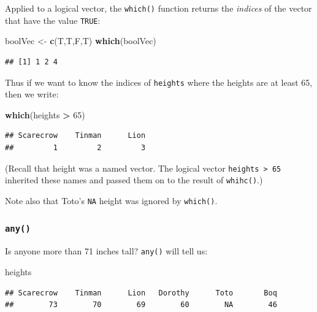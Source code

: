 \documentclass[]{book}
\makeatletter
\newenvironment{Shaded}{\begin{snugshade}}{\end{snugshade}}
\newcommand{\KeywordTok}[1]{\textcolor[rgb]{0.13,0.29,0.53}{\textbf{#1}}}
\newcommand{\DecValTok}[1]{\textcolor[rgb]{0.00,0.00,0.81}{#1}}
\newcommand{\StringTok}[1]{\textcolor[rgb]{0.31,0.60,0.02}{#1}}
\newcommand{\OperatorTok}[1]{\textcolor[rgb]{0.81,0.36,0.00}{\textbf{#1}}}
\newcommand{\NormalTok}[1]{#1}
\newenvironment{kframe}{%
\medskip{}
\setlength{\fboxsep}{.8em}
 \def\at@end@of@kframe{}%
 \ifinner\ifhmode%
  \def\at@end@of@kframe{\end{minipage}}%
  \begin{minipage}{\columnwidth}%
 \fi\fi%
 \def\FrameCommand##1{\hskip\@totalleftmargin \hskip-\fboxsep
 \colorbox{shadecolor}{##1}\hskip-\fboxsep
     \hskip-\linewidth \hskip-\@totalleftmargin \hskip\columnwidth}%
 \MakeFramed {\advance\hsize-\width
   \@totalleftmargin\z@ \linewidth\hsize
   \@setminipage}}%
 {\par\unskip\endMakeFramed%
 \at@end@of@kframe}
\renewenvironment{Shaded}{\begin{kframe}}{\end{kframe}}
\theoremstyle{definition}
\theoremstyle{definition}
\theoremstyle{definition}
\theoremstyle{remark}
\makeatother
\begin{document}
Applied to a logical vector, the \texttt{which()} function returns the
\emph{indices} of the vector that have the value \texttt{TRUE}:

\begin{Shaded}
\begin{Highlighting}[]
\NormalTok{boolVec <-}\StringTok{ }\KeywordTok{c}\NormalTok{(T,T,F,T)}
\KeywordTok{which}\NormalTok{(boolVec)}
\end{Highlighting}
\end{Shaded}

\begin{verbatim}
## [1] 1 2 4
\end{verbatim}

Thus if we want to know the indices of \texttt{heights} where the
heights are at least 65, then we write:

\begin{Shaded}
\begin{Highlighting}[]
\KeywordTok{which}\NormalTok{(heights }\OperatorTok{>}\StringTok{ }\DecValTok{65}\NormalTok{)}
\end{Highlighting}
\end{Shaded}

\begin{verbatim}
## Scarecrow    Tinman      Lion 
##         1         2         3
\end{verbatim}

(Recall that height was a named vector. The logical vector
\texttt{heights\ \textgreater{}\ 65} inherited these names and passed
them on to the result of \texttt{whihc()}.)

Note also that Toto's \texttt{NA} height was ignored by
\texttt{which()}.

\subsubsection{\texorpdfstring{\texttt{any()}}{any()}}\label{any}

Is anyone more than 71 inches tall?
\texttt{any()} will tell us:

\begin{Shaded}
\begin{Highlighting}[]
\NormalTok{heights}
\end{Highlighting}
\end{Shaded}

\begin{verbatim}
## Scarecrow    Tinman      Lion   Dorothy      Toto       Boq 
##        73        70        69        60        NA        46
\end{verbatim}
\end{document}
